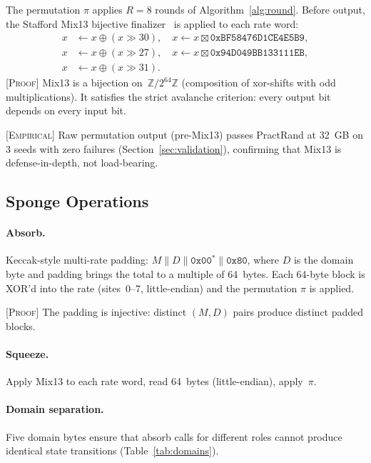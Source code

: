 \documentclass[runningheads]{llncs}
\newcommand{\proof}[1]{\textsc{[Proof]} #1}
\newcommand{\empirical}[1]{\textsc{[Empirical]} #1}
\newcommand{\Ztwo}{\mathbb{Z}/2^{64}\mathbb{Z}}
\begin{document}
The permutation $\pi$ applies $R = 8$ rounds of Algorithm~\ref{alg:round}.
Before output, the Stafford Mix13 bijective finalizer~\cite{stafford2011}
is applied to each rate word:
\begin{align*}
  x &\gets x \oplus (x \gg 30), \quad
  x \gets x \boxtimes \texttt{0xBF58476D1CE4E5B9}, \\
  x &\gets x \oplus (x \gg 27), \quad
  x \gets x \boxtimes \texttt{0x94D049BB133111EB}, \\
  x &\gets x \oplus (x \gg 31).
\end{align*}
\proof{Mix13 is a bijection on~$\Ztwo$ (composition of xor-shifts with odd multiplications).
It satisfies the strict avalanche criterion: every output bit depends on every input bit.}

\empirical{Raw permutation output (pre-Mix13) passes PractRand at 32~GB
on 3 seeds with zero failures (Section~\ref{sec:validation}), confirming
that Mix13 is defense-in-depth, not load-bearing.}

\subsection{Sponge Operations}

\paragraph{Absorb.}
Keccak-style multi-rate padding: $M \| D \| \texttt{0x00}^* \| \texttt{0x80}$,
where $D$ is the domain byte and padding brings the total to a multiple of
64~bytes.  Each 64-byte block is XOR'd into the rate (sites~0--7, little-endian)
and the permutation $\pi$ is applied.

\proof{The padding is injective: distinct $(M, D)$ pairs produce distinct padded blocks.}

\paragraph{Squeeze.}
Apply Mix13 to each rate word, read 64~bytes (little-endian), apply~$\pi$.

\paragraph{Domain separation.}
Five domain bytes ensure that absorb calls for different roles cannot produce
identical state transitions (Table~\ref{tab:domains}).
\end{document}
